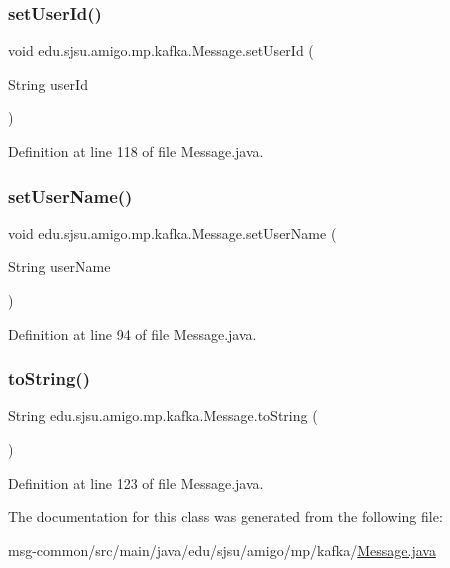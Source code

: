 \subsubsection{\texorpdfstring{set\+User\+Id()}{setUserId()}}
{\footnotesize\ttfamily void edu.\+sjsu.\+amigo.\+mp.\+kafka.\+Message.\+set\+User\+Id (\begin{DoxyParamCaption}\item[{String}]{user\+Id }\end{DoxyParamCaption})}



Definition at line 118 of file Message.\+java.

\mbox{\label{classedu_1_1sjsu_1_1amigo_1_1mp_1_1kafka_1_1_message_a23ef3ab25dad5c06740a4bff403030a6}} 
\subsubsection{\texorpdfstring{set\+User\+Name()}{setUserName()}}
{\footnotesize\ttfamily void edu.\+sjsu.\+amigo.\+mp.\+kafka.\+Message.\+set\+User\+Name (\begin{DoxyParamCaption}\item[{String}]{user\+Name }\end{DoxyParamCaption})}



Definition at line 94 of file Message.\+java.

\mbox{\label{classedu_1_1sjsu_1_1amigo_1_1mp_1_1kafka_1_1_message_a7788b925c3ded0309bd31e036224ca9b}} 
\subsubsection{\texorpdfstring{to\+String()}{toString()}}
{\footnotesize\ttfamily String edu.\+sjsu.\+amigo.\+mp.\+kafka.\+Message.\+to\+String (\begin{DoxyParamCaption}{ }\end{DoxyParamCaption})}



Definition at line 123 of file Message.\+java.



The documentation for this class was generated from the following file\+:\begin{DoxyCompactItemize}
\item 
msg-\/common/src/main/java/edu/sjsu/amigo/mp/kafka/\hyperlink{_message_8java}{Message.\+java}\end{DoxyCompactItemize}
